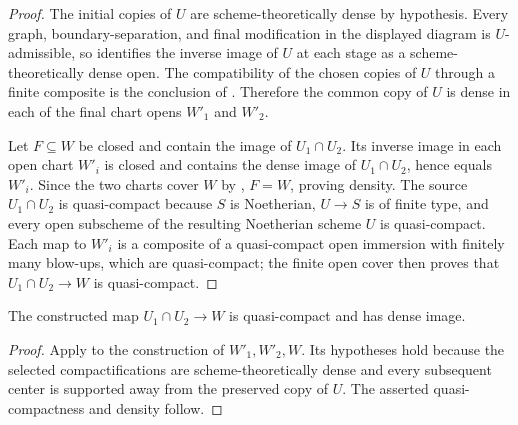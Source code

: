 \begin{proof}
  The initial copies of $U$ are scheme-theoretically dense by hypothesis.
  Every graph, boundary-separation, and final modification in the displayed
  diagram is $U$-admissible, so
   identifies the
  inverse image of $U$ at each stage as a scheme-theoretically dense open.
  The compatibility of the chosen copies of $U$ through a finite composite is
  the conclusion of
  .  Therefore the common copy of
  $U$ is dense in each of the final chart opens $W'_1$ and $W'_2$.

  Let $F\subseteq W$ be closed and contain the image of
  $U_1\cap U_2$.  Its inverse image in each open chart $W'_i$ is closed and
  contains the dense image of $U_1\cap U_2$, hence equals $W'_i$.  Since the
  two charts cover $W$ by
  , $F=W$, proving density.
  The source $U_1\cap U_2$ is quasi-compact because $S$ is Noetherian,
  $U\to S$ is of finite type, and every open subscheme of the resulting
  Noetherian scheme $U$ is quasi-compact.  Each map to $W'_i$ is a composite
  of a quasi-compact open
  immersion with finitely many blow-ups, which are quasi-compact; the finite
  open cover then proves that $U_1\cap U_2\to W$ is quasi-compact.
\end{proof}

\begin{lemma}
  \label{lemma:nagata-final-density}

  The constructed map $U_1\cap U_2\to W$ is quasi-compact and has dense
  image.
\end{lemma}

\begin{proof}
  Apply  to the construction of
  $W'_1,W'_2,W$.  Its hypotheses hold because the selected compactifications
  are scheme-theoretically dense and every subsequent center is supported
  away from the preserved copy of $U$.  The asserted quasi-compactness and
  density follow.
\end{proof}

